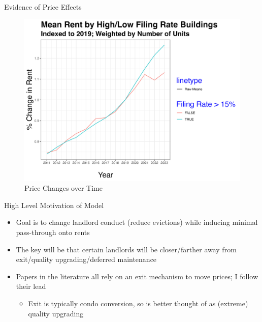 \documentclass[10pt, xcolor=dvipsnames]{beamer}
\begin{document}
\begin{frame}{Evidence of Price Effects}
    \begin{figure}
        \centering
        \includegraphics[width=0.5\linewidth]{figs/mean_price_quintile.png}
        \caption{Price Changes over Time}
        \label{fig:price-high-filing}
    \end{figure}
    
\end{frame}

\begin{frame}{High Level Motivation of Model}
\begin{itemize}
    \item Goal is to change landlord conduct (reduce evictions) while inducing minimal pass-through onto rents
    \item The key will be that certain landlords will be closer/farther away from exit/quality upgrading/deferred maintenance 
    \item Papers in the literature \cite{diamond-2019, collinson2024eviction, } all rely on an exit mechanism to move prices; I follow their lead
    \begin{itemize}
        \item Exit is typically condo conversion, so is better thought of as (extreme) quality upgrading
    \end{itemize}
\end{itemize}
    
\end{frame}


\end{document}
